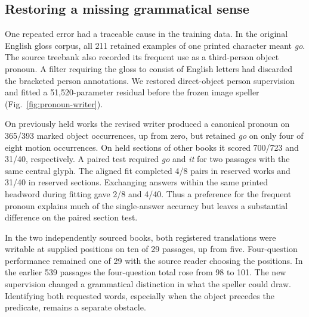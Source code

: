 \subsection*{Restoring a missing grammatical sense}
One repeated error had a traceable cause in the training data. In the original English gloss corpus, all 211 retained examples of one printed character meant \textit{go}. The source treebank also recorded its frequent use as a third-person object pronoun. A filter requiring the gloss to consist of English letters had discarded the bracketed person annotations. We restored direct-object person supervision and fitted a 51,520-parameter residual before the frozen image speller (Fig.~\ref{fig:pronoun-writer}).

On previously held works the revised writer produced a canonical pronoun on 365/393 marked object occurrences, up from zero, but retained \textit{go} on only four of eight motion occurrences. On held sections of other books it scored 700/723 and 31/40, respectively. A paired test required \textit{go} and \textit{it} for two passages with the same central glyph. The aligned fit completed 4/8 pairs in reserved works and 31/40 in reserved sections. Exchanging answers within the same printed headword during fitting gave 2/8 and 4/40. Thus a preference for the frequent pronoun explains much of the single-answer accuracy but leaves a substantial difference on the paired section test.

In the two independently sourced books, both registered translations were writable at supplied positions on ten of 29 passages, up from five. Four-question performance remained one of 29 with the source reader choosing the positions. In the earlier 539 passages the four-question total rose from 98 to 101. The new supervision changed a grammatical distinction in what the speller could draw. Identifying both requested words, especially when the object precedes the predicate, remains a separate obstacle.
